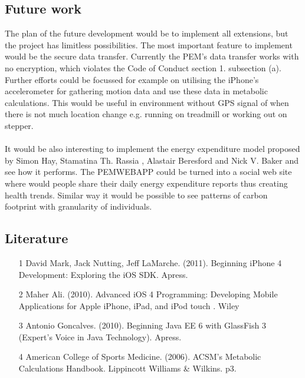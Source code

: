 \documentclass[12pt, a4paper]{report}   %
\begin{document}
\begin{enumerate}
\section{Future work}
The plan of the future development would be to implement all extensions, but the project has limitless possibilities.  The most important feature to implement would be the secure data transfer. Currently the PEM's data transfer works with no encryption, which violates the Code of Conduct section 1. subsection (a). Further efforts could be focussed for example on utilising the iPhone's accelerometer for gathering motion data and use these data in metabolic calculations. This would be useful in environment without GPS signal of when there is not much location change e.g. running on treadmill or working out on stepper.\\ \\
It would be also interesting to implement the energy expenditure model proposed by Simon Hay, Stamatina Th. Rassia , Alastair Beresford and Nick V. Baker and see how it performs. The PEMWEBAPP could be turned into a social web site where would people share their daily energy expenditure reports thus creating health trends. Similar way it would be possible to see patterns of carbon footprint with granularity of individuals.

\begin{thebibliography}{9}
 
\subsection*{Literature}

\begin{itemize}
	\item [1] David Mark, Jack Nutting, Jeff LaMarche. (2011). Beginning iPhone 4 Development: Exploring the iOS SDK. Apress.\\
	\item [2] Maher Ali. (2010). Advanced iOS 4 Programming: Developing Mobile Applications for Apple iPhone, iPad, and iPod touch
. Wiley\\
	\item [3] Antonio Goncalves. (2010). Beginning Java EE 6 with GlassFish 3 (Expert's Voice in Java Technology). Apress.\\
	\item [4] American College of Sports Medicine. (2006). ACSM's Metabolic Calculations Handbook. Lippincott Williams \& Wilkins. p3.\\
\end{itemize}


\end{thebibliography}
\end{enumerate}
\end{document}
